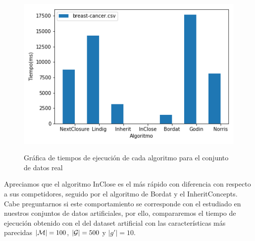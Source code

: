 \documentclass[oneside,openright,titlepage,numbers=noenddot,openany,headinclude,footinclude=true,
cleardoublepage=empty,abstractoff,BCOR=5mm,paper=a4,fontsize=12pt,main=spanish]{scrreprt}
\begin{document}
\begin{itemize}
\begin{figure}[H]
  \centering
  \includegraphics[scale=0.6]{images/total-breast.png}
  \label{fig:totalbreast}
\caption{Gráfica de tiempos de ejecución de cada algoritmo para el conjunto de datos real }
\end{figure}
Apreciamos que el algoritmo InClose es el más rápido con diferencia con respecto a sus competidores, seguido por el algoritmo de Bordat y el InheritConcepts. Cabe preguntarnos si este comportamiento se corresponde con el estudiado en nuestros conjuntos de datos artificiales, por ello, compararemos el tiempo de ejecución obtenido con el del dataset artificial con las características más parecidas $|\mathcal{M}|=100$, $|\mathcal{G}|=500$ y $|g'|=10$.
\begin{table}[H]
    \centering
    \caption{Tabla comparativa de tiempos de ejecución en ms para el conjunto de datos de cancer de pulmon y uno artificial.}
\end{table}


\end{itemize}
\end{document}
